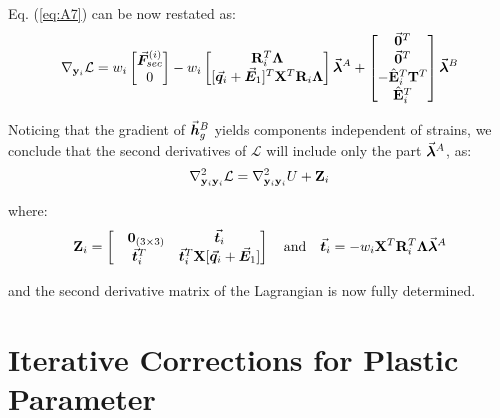\begin{appendices}
\noindent Eq. (\ref{eq:A7}) can be now restated as:
\begin{gather}
	\nabla_{\mathbf{y}_i}\mathcal{L} = w_i\begin{bmatrix}
		\bvec{F}_{sec}^{(i)} \\ 0
	\end{bmatrix} - w_i\begin{bmatrix}
		\bmat{R}_i^T\bmat{\Lambda} \\
		[\bvec{q}_i+\bvec{E}_1]^T\bmat{X}^T\bmat{R}_i\bmat{\Lambda}
	\end{bmatrix}\bvec{\lambda}^A + \begin{bmatrix}
		\bvec{0}^T \\ \bvec{0}^T \\ -\hat{\mathbf{E}}_i^T\bmat{T}^T \\ 
		\hat{\mathbf{E}}_i^T
	\end{bmatrix}\bvec{\lambda}^B
	\label{eq:this}
\end{gather}

\noindent Noticing that the gradient of $\vec{\bm{h}}_g^B$ yields components 
independent of
strains, we conclude that the second derivatives of $\mathcal{L}$ will include
only the part $\vec{\bm{\lambda}}^A$, as:
\begin{gather}
	\nabla^2_{\mathbf{y}_i\mathbf{y}_i}\mathcal{L} =
	\nabla^2_{\mathbf{y}_i\mathbf{y}_i}U
	+ \mathbf{Z}_i
	\label{eq:second}
\end{gather}

\noindent where:
\begin{gather}
	\mathbf{Z}_i = \begin{bmatrix}
		\ \ \ \mathbf{0}_{(3\times 3)} & \vec{\bm{t}}_i\\ \vec{\bm{t}}_i^T &
		\vec{\bm{t}}_i^T\mathbf{X}[\vec{\bm{q}}_i+\vec{\bm{E}}_1]
	\end{bmatrix}\quad\text{and}\quad \vec{\bm{t}}_i =
	-w_i\mathbf{X}^T\mathbf{R}_i^T\mathbf{\Lambda}\vec{\bm{\lambda}}^A\nonumber
\end{gather}

\noindent and the second derivative matrix of the Lagrangian is now fully
determined.

\chapter{Iterative Corrections for Plastic Parameter}\label{appendix:APPENDIX_C}


\end{appendices}
